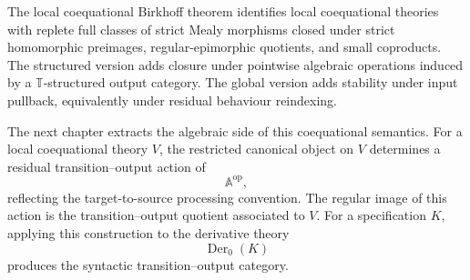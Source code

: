 The local coequational Birkhoff theorem identifies local coequational theories
with replete full classes of strict Mealy morphisms closed under strict
homomorphic preimages, regular-epimorphic quotients, and small coproducts. The
structured version adds closure under pointwise algebraic operations induced by
a \(\mathbb T\)-structured output category. The global version adds stability
under input pullback, equivalently under residual behaviour reindexing.

The next chapter extracts the algebraic side of this coequational semantics.
For a local coequational theory \(V\), the restricted canonical object on \(V\)
determines a residual transition--output action of
\[
    \mathbb A^{\mathrm{op}},
\]
reflecting the target-to-source processing convention. The regular image of
this action is the transition--output quotient associated to \(V\). For a
specification \(K\), applying this construction to the derivative theory
\[
    \operatorname{Der}_0(K)
\]
produces the syntactic transition--output category.